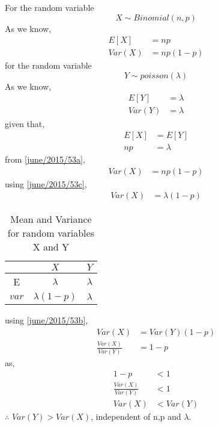 For the random variable $$X\sim Binomial(n, p)$$
As we know,
\begin{align}
E[X]&=np\\
Var(X)&=np(1-p) \label{june/2015/53a}
\end{align}
for the random variable $$Y\sim poisson(\lambda)$$
As we know,
\begin{align}
E[Y]&=\lambda\\
Var(Y)&=\lambda \label{june/2015/53b}
\end{align}
given that,
\begin{align}
E[X]&=E[Y]\\
np&=\lambda \label{june/2015/53c}
\end{align}
from \eqref{june/2015/53a},
\begin{align}
Var(X)&=np(1-p)
\end{align}
using \eqref{june/2015/53c},
\begin{align}
Var(X)&=\lambda(1-p)
\end{align}
\begin{table}[ht]
\caption{Mean and Variance for random variables X and Y}
\begin{center}
    \begin{tabular}{|c|c|c|}
    \hline
     & $X$&$Y$\\
    \hline
    E& $\lambda$& $\lambda$\\
    \hline
     $var$& $\lambda(1-p)$ & $\lambda$\\
    \hline
    \end{tabular}
\end{center} 
\label{june/2015/53tab:1}
\end{table}
using \eqref{june/2015/53b},
\begin{align}
Var(X)&=Var(Y)(1-p)\\
\frac{Var(X)}{Var(Y)}&= 1-p
\end{align}
as,
\begin{align}
1-p &<1\\
\frac{Var(X)}{Var(Y)}&<1\\
Var(X) &< Var(Y)
\end{align}
$\therefore$ $Var(Y) >Var(X)$, independent of n,p and $\lambda$.
